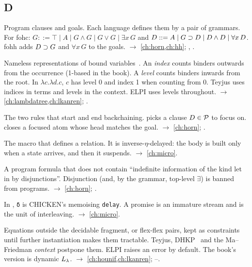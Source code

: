 \subsection*{D}
\begin{glossarylist}
\item[D-formula, G-formula] Program clauses and goals. Each language defines them by a pair of grammars. For fohc:
  $G ::= \top\mid A\mid G\wedge G\mid G\vee G\mid \exists x\,G$ and $D ::= A\mid G\supset D\mid D\wedge D\mid\forall x\,D$.
  fohh adds $D\supset G$ and $\forall x\,G$ to the goals. $\rightarrow$ \cref{ch:horn,ch:hh}; , .
\item[de Bruijn index, de Bruijn level] Nameless representations of bound variables~\cite{deBruijn1972}. An
  \emph{index} counts binders outwards from the occurrence (1-based in the book). A \emph{level} counts binders
  inwards from the root. In $\lambda c.\lambda d.c$, $c$ has level 0 and index 1 when counting from 0. Teyjus uses
  indices in terms and levels in the context. ELPI uses levels throughout.
  $\rightarrow$ \cref{ch:lambdatree,ch:lkanren}; .
\item[Decide, initial] The two rules that start and end backchaining.  picks a clause $D\in\mathcal{P}$
  to focus on.  closes a focused atom whose head matches the goal.
  $\rightarrow$ \cref{ch:horn}; .
\item[\texttt{define-relation}] The \micro{} macro that defines a relation. It is inverse-$\eta$-delayed: the body
  is built only when a state arrives, and then it suspends. $\rightarrow$ \cref{ch:micro}.
\item[Definite formula] A program formula that does not contain \enquote{indefinite information of the kind let in
  by disjunctions}. Disjunction (and, by the grammar, top-level $\exists$) is banned from programs.
  $\rightarrow$ \cref{ch:horn}; .
\item[Delay, \texttt{δ}] In \micro{}, \texttt{δ} is CHICKEN's memoising \texttt{delay}. A promise is an immature
  stream and is the unit of interleaving. $\rightarrow$ \cref{ch:micro}.
\item[Delayed (postponed) equations] Equations outside the decidable fragment, or flex-flex pairs, kept as
  constraints until further instantiation makes them tractable. Teyjus, DHKP~\cite{DowekHardinKirchnerPfenning1996}
  and the Ma--Friedman \emph{context} postpone them. ELPI raises an error by default. The book's version is
  dynamic $L_\lambda$. $\rightarrow$ \cref{ch:hounif,ch:lkanren}; --.

\end{glossarylist}
